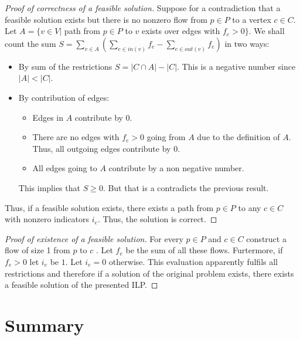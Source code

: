 \begin{proof}[Proof of correctness of a feasible solution]
  Suppose for a contradiction that a feasible solution exists but there is no nonzero flow from $p \in P$ to a vertex $c \in C$. Let $A = \{v \in V | $ path from $p \in P$ to $v$ exists over edges with $ f_e \gt 0\}$. We shall count the sum $S = \sum_{v \in A}(\sum_{e \in in(v)} f_e - \sum_{e \in out(v)} f_e)$ in two ways:
  \begin{itemize}
    \item By sum of the restrictions $S = | C \cap A | - | C |$. This is a negative number since $| A | \lt | C |$.
    \item By contribution of edges:
      \begin{itemize}
        \item Edges in $A$ contribute by $0$.
        \item There are no edges with $f_e \gt 0$ going from $A$ due to the definition of $A$. Thus, all outgoing edges contribute by $0$.
        \item All edges going to $A$ contribute by a non negative number.
      \end{itemize}
      This implies that $S \geq 0$. But that is a contradicts the previous result.
    \end{itemize}
  Thus, if a feasible solution exists, there exists a path from $p \in P$ to any $c \in C$ with nonzero indicators $i_e$. Thus, the solution is correct.
\end{proof}
\begin{proof}[Proof of existence of a feasible solution]
  For every $p \in P$ and $c \in C$ construct a flow of size 1 from $p$ to $c$ . Let $f_e$ be the sum of all these flows. Furtermore, if $f_e \gt 0$ let $i_e$ be $1$. Let $i_e = 0$ otherwise. This evaluation apparently fulfils all restrictions and therefore if a solution of the original problem exists, there exists a feasible solution of the presented ILP.
\end{proof}
\myendalg



\section{Summary}


